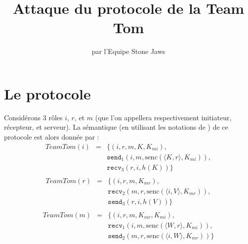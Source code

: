 \documentclass[a4paper,10pt]{article}
\title{Attaque du protocole de la Team Tom}
\author{par l'Equipe Stone Jaws}
\begin{document}
\maketitle

\section{Le protocole}

Considérons 3 rôles $i$, $r$, et $m$ (que l'on appellera respectivement initiateur, récepteur, et serveur). La sémantique (en utilisant les notations de \cite{cas}) de ce protocole est alors donnée par :
\begin{eqnarray*}
	TeamTom(i) & = & \{ (i,r,m, K, K_{mi}), \\
		& & \texttt{send}_1(i,m, \textrm{senc}(\langle K,r \rangle, K_{mi}) ), \\
		& & \texttt{recv}_3(r,i,  h(K) ) \}\\
\end{eqnarray*}
\begin{eqnarray*}
	TeamTom(r) & = & \{ (i,r,m, K_{mr}), \\
		& & \texttt{recv}_2(m,r, \textrm{senc}(\langle i,V \rangle, K_{mr}) ), \\
		& & \texttt{send}_3(r,i,  h(V ) )  \} \\
\end{eqnarray*}
\begin{eqnarray*}
	TeamTom(m) & = & \{ (i,r,m, K_{mr}, K_{mi}), \\
		& & \texttt{recv}_1(i,m, \textrm{senc}(\langle W,r \rangle, K_{mi}) ), \\
		& & \texttt{send}_2(m,r, \textrm{senc}(\langle i,W \rangle, K_{mr}) )  \} \\
\end{eqnarray*}
\end{document}
